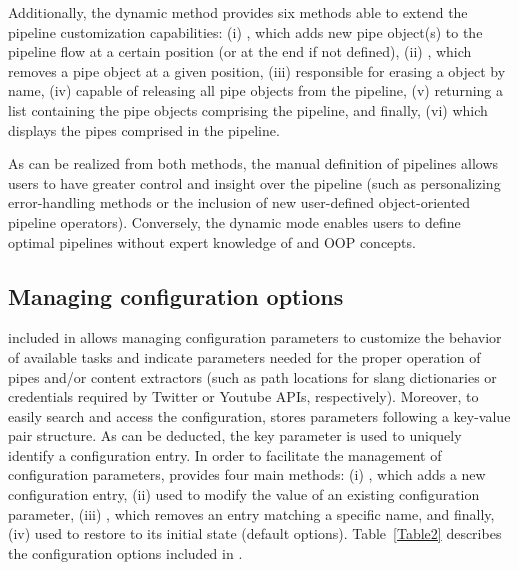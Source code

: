 Additionally, the dynamic method provides six methods able to extend the pipeline customization capabilities: (i) , which adds new pipe object(s) to the pipeline flow at a certain position (or at the end if not defined), (ii) , which removes a pipe object at a given position, (iii)  responsible for erasing a  object by name, (iv)  capable of releasing all pipe objects from the pipeline, (v)  returning a list containing the pipe objects comprising the pipeline, and finally, (vi)  which displays the pipes comprised in the pipeline.

As can be realized from both methods, the manual definition of pipelines allows users to have greater control and insight over the pipeline (such as personalizing error-handling methods or the inclusion of new user-defined object-oriented pipeline operators). Conversely, the dynamic mode enables users to define optimal pipelines without expert knowledge of  and OOP concepts.

\subsection{Managing  configuration options}

 included in  allows managing configuration parameters to customize the behavior of available tasks and indicate parameters needed for the proper operation of pipes and/or content extractors (such as path locations for slang dictionaries or credentials required by Twitter or Youtube APIs, respectively). Moreover, to easily search and access the configuration,  stores parameters following a key-value pair structure. As can be deducted, the key parameter is used to uniquely identify a configuration entry. In order to facilitate the management of configuration parameters,  provides four main methods: (i) , which adds a new configuration entry, (ii)  used to modify the value of an existing configuration parameter, (iii) , which removes an entry matching a specific name, and finally, (iv)  used to restore  to its initial state (default options). Table~\ref{Table2} describes the configuration options included in . 

